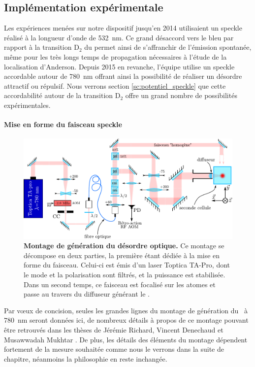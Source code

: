 \subsection{Implémentation expérimentale}
\label{sc:montage_diffuseur}
Les expériences menées sur notre dispositif jusqu'en 2014 utilisaient un speckle réalisé à la longueur d'onde de \SI{532}{\nano\metre}. Ce grand désaccord vers le bleu par rapport à la transition $\mathrm{D}_2$ du  permet ainsi de s'affranchir de l'émission spontanée, même pour les très longs temps de propagation nécessaires à l'étude de la localisation d'Anderson. Depuis 2015 en revanche, l'équipe utilise un speckle accordable autour de \SI{780}{\nano\metre} offrant ainsi la possibilité de réaliser un désordre attractif ou répulsif. Nous verrons section \ref{sc:potentiel_speckle} que cette accordabilité autour de la transition $\mathrm{D}_2$ offre un grand nombre de possibilités expérimentales.

\paragraph*{Mise en forme du faisceau speckle}

\begin{figure}
\centering
\includegraphics[width=\textwidth]{Fig/Speckle/montage_speckle_taus.pdf}
\caption{\textbf{Montage de génération du désordre optique.} Ce montage se décompose en deux parties, la première étant dédiée à la mise en forme du faisceau. Celui-ci est émis d'un laser Toptica TA-Pro, dont le mode et la polarisation sont filtrés, et la puissance est stabilisée. Dans un second temps, ce faisceau est focalisé sur les atomes et passe au travers du diffuseur générant le \speckle .}
\label{fig:montage_speckle_taus}
\end{figure}

Par vœux de concision, seules les grandes lignes du montage de génération du \speckle\ à \SI{780}{\nano\metre} seront données ici, de nombreux détails à propos de ce montage pouvant être retrouvés dans les thèses de Jérémie Richard, Vincent Denechaud et Musawwadah Mukhtar \citep{richard2015propagation, denechaud2018vers, mukhtar2019state}. De plus, les détails des éléments du montage dépendent fortement de la mesure souhaitée comme nous le verrons dans la suite de chapitre, néanmoins la philosophie en reste inchangée.

